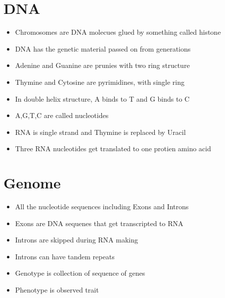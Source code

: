\documentclass{article}
\begin{document}
	\section{DNA}
		\begin{itemize}
			\item Chromosomes are DNA molecues glued by something called histone
			\item DNA has the genetic material passed on from generations
			\item Adenine and Guanine are prunies with two ring structure
			\item Thymine and Cytosine are pyrimidines, with single ring
			\item In double helix structure, A binds to T and G binds to C
			\item A,G,T,C are called nucleotides
			\item RNA is single strand and Thymine is replaced by Uracil
			\item Three RNA nucleotides get translated to one protien amino acid
		\end{itemize}
	
	\section{Genome}
	\begin{itemize}
		\item All the nucleotide sequences including Exons and Introns
		\item Exons are DNA sequenes that get transcripted to RNA
		\item Introns are skipped during RNA making
		\item Introns can have tandem repeats
		\item Genotype is collection of sequence of genes
		\item Phenotype is observed trait
	\end{itemize}
\end{document}

